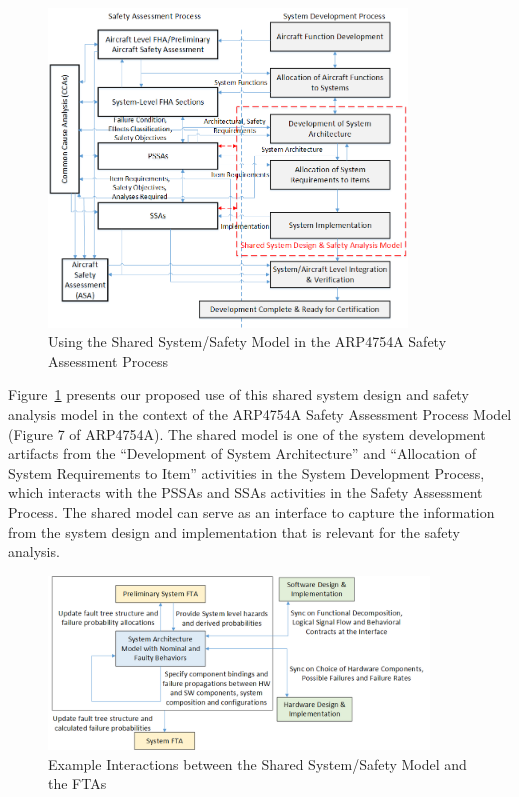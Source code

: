\begin{figure}[t!]
	\vspace{-0.19in}
	\centering
	\includegraphics[trim=0 9 0 5,clip,width=0.85\textwidth]{images/Safety_Assessment_Process.png}
	\caption{Using the Shared System/Safety Model in the ARP4754A Safety Assessment Process}
	\label{fig:proposed_safety_process}
\end{figure}

Figure~\ref{fig:proposed_safety_process} presents our proposed use of this shared system design and safety analysis model in the context of the ARP4754A Safety Assessment Process Model (Figure 7 of ARP4754A). The shared model is one of the system development artifacts from the ``Development of System Architecture'' and ``Allocation of System Requirements to Item'' activities in the System Development Process, which interacts with the PSSAs and SSAs activities in the Safety Assessment Process. The shared model can serve as an interface to capture the information from the system design and implementation that is relevant for the safety analysis.

\begin{figure}[t!]
	\vspace{-0.19in}
	\centering
	\includegraphics[width=0.9\textwidth]{images/FTA_MBD_Workflow.png}
	\caption{Example Interactions between the Shared System/Safety Model and  the FTAs}
	\label{fig:interaction_with_FTA}
\end{figure}

